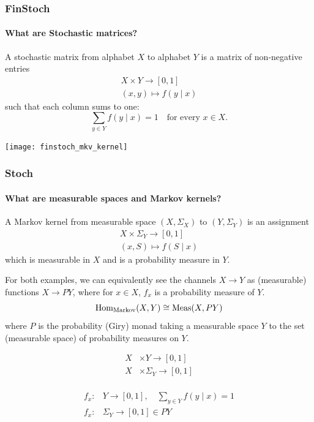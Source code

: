 \begin{frame}
    \frametitle{FinStoch}
    \framesubtitle{What are Stochastic matrices?}
    \begin{minipage}{.48\textwidth}
        A stochastic matrix from alphabet $X$ to alphabet $Y$ is a matrix of non-negative entries
        \begin{align*}
            X\times Y \to [0,1]\\
            (x, y) \mapsto f(y\mid x)
        \end{align*}
        such that each column sums to one:
        \[
            \sum_{y\in Y} f(y\mid x) = 1 \quad \text{for every $x\in X$.}
        \]
    \end{minipage}
    \hfill
    \begin{minipage}{.48\textwidth}
        \texttt{[image: finstoch\_mkv\_kernel]}
    \end{minipage}
\end{frame}

\begin{frame}
    \frametitle{Stoch}
    \framesubtitle{What are measurable spaces and Markov kernels?}
    A Markov kernel from measurable space $(X, \Sigma_X)$ to $(Y, \Sigma_Y)$ is an assignment
    \begin{align*}
        X\times \Sigma_Y \to [0, 1]\\
        (x, S) \mapsto f(S\mid x)
    \end{align*}
    which is measurable in $X$ and is a probability measure in $Y$.
\end{frame}

\begin{frame}
    For both examples, we can equivalently see the channels $X\to Y$ as (measurable) functions $X\to PY$, where for $x\in X$, $f_x$ is a probability measure of $Y$.\pause
    \[
        \text{\normalfont Hom} _\text{\normalfont Markov} (X, Y) \cong \text{\normalfont Meas} (X, PY)
    \]
    where $P$ is the probability (Giry) monad taking a measurable space $Y$ to the set (measurable space) of probability measures on $Y$.\pause

    \begin{minipage}{.3\textwidth}
        \begin{align*}
            X&\times Y \to [0, 1]\\
            X&\times \Sigma_Y \to [0, 1]\\
        \end{align*}
    \end{minipage}
    \hfill
    \begin{minipage}{.6\textwidth}
        \begin{align*}
            f_x: &Y\to [0, 1],\quad \sum\nolimits_{y\in Y} f(y \mid x) = 1\\
            f_x: &\Sigma_Y\to [0, 1] \in PY \\
        \end{align*}
    \end{minipage}
    
\end{frame}

